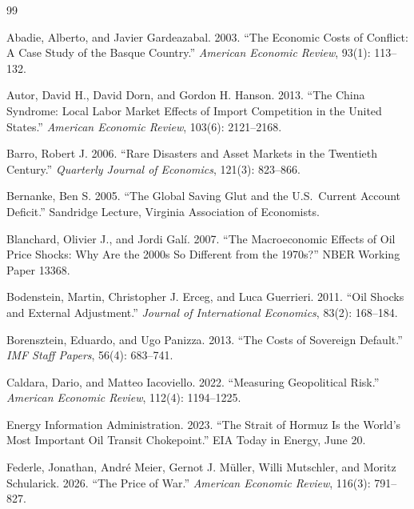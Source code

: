 \documentclass[12pt]{article}
\begin{document}
\begin{thebibliography}{99}

Abadie, Alberto, and Javier Gardeazabal. 2003. ``The Economic Costs of Conflict: A Case Study of the Basque Country.'' \textit{American Economic Review}, 93(1): 113--132.

Autor, David H., David Dorn, and Gordon H. Hanson. 2013. ``The China Syndrome: Local Labor Market Effects of Import Competition in the United States.'' \textit{American Economic Review}, 103(6): 2121--2168.

Barro, Robert J. 2006. ``Rare Disasters and Asset Markets in the Twentieth Century.'' \textit{Quarterly Journal of Economics}, 121(3): 823--866.

Bernanke, Ben S. 2005. ``The Global Saving Glut and the U.S.\ Current Account Deficit.'' Sandridge Lecture, Virginia Association of Economists.

Blanchard, Olivier J., and Jordi Gal\'{i}. 2007. ``The Macroeconomic Effects of Oil Price Shocks: Why Are the 2000s So Different from the 1970s?'' NBER Working Paper 13368.

Bodenstein, Martin, Christopher J. Erceg, and Luca Guerrieri. 2011. ``Oil Shocks and External Adjustment.'' \textit{Journal of International Economics}, 83(2): 168--184.

Borensztein, Eduardo, and Ugo Panizza. 2013. ``The Costs of Sovereign Default.'' \textit{IMF Staff Papers}, 56(4): 683--741.

Caldara, Dario, and Matteo Iacoviello. 2022. ``Measuring Geopolitical Risk.'' \textit{American Economic Review}, 112(4): 1194--1225.

Energy Information Administration. 2023. ``The Strait of Hormuz Is the World's Most Important Oil Transit Chokepoint.'' EIA Today in Energy, June 20.

Federle, Jonathan, Andr\'{e} Meier, Gernot J. M\"{u}ller, Willi Mutschler, and Moritz Schularick. 2026. ``The Price of War.'' \textit{American Economic Review}, 116(3): 791--827.


\end{thebibliography}
\end{document}
